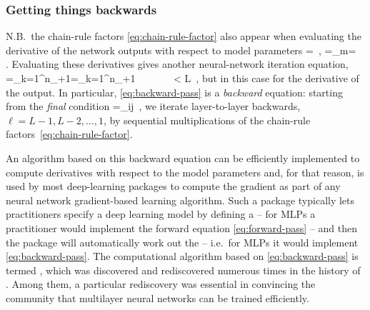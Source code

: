 \subsubsection{Getting things backwards}
N.B.~the chain-rule factors \eqref{eq:chain-rule-factor} also appear when evaluating the derivative of the network outputs with respect to model parameters
\be
{}=\, , \qquad  {}=\sum_{m}= \, . 
\ee
Evaluating these derivatives gives another neural-network iteration equation,
\be\label{eq:backward-pass}
=\sum_{k=1}^{n_{\ell+1}}=\sum_{k=1}^{n_{\ell+1}} \, \ \ \ \ \ \ \ell < L\, ,
\ee
but in this case for the derivative of the output. In particular,
\eqref{eq:backward-pass} is a \emph{backward} equation: starting from the \emph{final} condition 
\be
{}=\delta_{ij}\, ,
\ee 
we iterate layer-to-layer 
backwards, $\ell=L-1, L-2, \ldots, 1$, by sequential multiplications of the chain-rule factors~\eqref{eq:chain-rule-factor}.


An algorithm based on this backward equation can be efficiently implemented to compute derivatives with respect to the model parameters and, for that reason, is used by most deep-learning packages to compute the gradient as part of any neural network gradient-based learning algorithm. Such a package typically lets practitioners specify a deep learning model by defining a  -- for MLPs a practitioner would implement the forward equation \eqref{eq:forward-pass} -- and then the package will automatically work out the  -- i.e.~for MLPs it would implement \eqref{eq:backward-pass}.
The computational algorithm based on \eqref{eq:backward-pass} is termed ,
which was discovered and rediscovered numerous times in the history of .
Among them, a particular rediscovery \cite{rumelhart1985learning} was essential in convincing the  community that multilayer neural networks can be trained efficiently.

